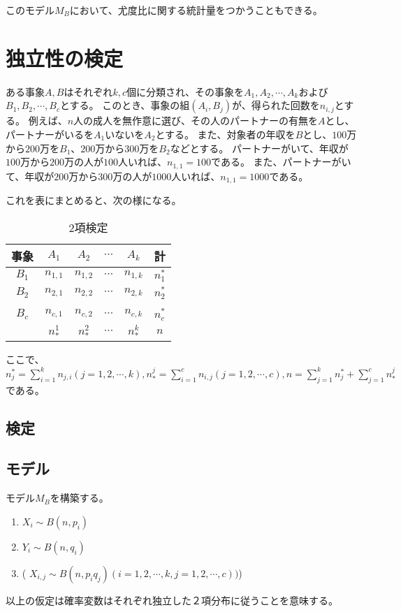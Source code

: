 このモデル$M_B$において、尤度比に関する統計量をつかうこともできる。





\section{独立性の検定}
ある事象$A,B$はそれぞれ$k,c$個に分類され、その事象を$A_1,A_2,\cdots,A_k$および$B_1,B_2,\cdots,B_c$とする。
このとき、事象の組$(A_i,B_j)$が、得られた回数を$n_{i,j}$とする。
例えば、$n$人の成人を無作意に選び、その人のパートナーの有無を$A$とし、パートナーがいるを$A_1$いないを$A_2$とする。
また、対象者の年収を$B$とし、$100$万から$200$万を$B_1$、$200$万から$300$万を$B_2$などとする。
パートナーがいて、年収が$100$万から$200$万の人が$100$人いれば、$n_{1,1}=100$である。
また、パートナーがいて、年収が$200$万から$300$万の人が$1000$人いれば、$n_{1,1}=1000$である。

これを表にまとめると、次の様になる。
\begin{table}[hbtp]
 \caption{2項検定}
 \label{table:binomial_test2}
 \centering
\begin{tabular}{c|cccc|c}
 事象& $A_1$ & $A_2$ & $\cdots$ & $A_k$ & 計 \\ \hline
 $B_1$ & $n_{1,1}$ & $n_{1,2}$ & $\cdots$ & $n_{1,k}$ &$n_1^*$ \\ 
 $B_2$ & $n_{2,1}$ & $n_{2,2}$ & $\cdots$ & $n_{2,k}$ &  $n_2^*$ \\
 & & & & & \\
 $B_c$ & $n_{c,1}$ & $n_{c,2}$ & $\cdots$ & $n_{c,k}$ &  $n_c^*$ \\ 
       & $n_*^1$ & $n_*^2$     & $\cdots$ & $n_*^k $  & $n$
\end{tabular}
\end{table}
ここで、$n_j^* = \sum_{i=1}^k n_{j,i} (j=1,2,\cdots,k), n_*^j = \sum_{i=1}^c n_{i,j} (j=1,2,\cdots,c), n = \sum_{j=1}^k n_j^*+ \sum_{j=1}^c n_*^j$である。



\subsection{検定}


\subsection{モデル}
モデル$M_B$を構築する。
\begin{enumerate}
 \item $X_{i} \sim B(n,p_i)$
 \item $Y_{i} \sim B(n,q_i)$
 \item ( $X_{i,j} \sim B(n, p_i q_j)  (i=1,2,\cdots,k, j=1,2,\cdots,c))$)
\end{enumerate}
以上の仮定は確率変数はそれぞれ独立した２項分布に従うことを意味する。

